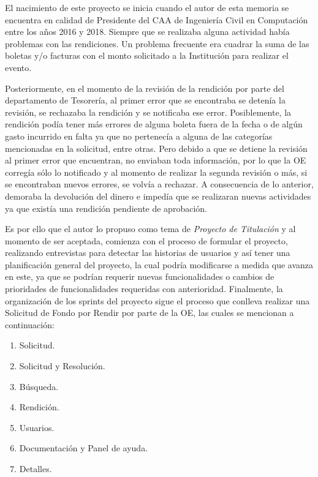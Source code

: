 El nacimiento de este proyecto se inicia cuando el autor de esta memoria se encuentra en calidad de Presidente del CAA de Ingeniería Civil en Computación entre los años 2016 y 2018. Siempre que se realizaba alguna actividad había problemas con las rendiciones. Un problema frecuente era cuadrar la suma de las boletas y/o facturas con el monto solicitado a la Institución para realizar el evento. 

Posteriormente, en el momento de la revisión de la rendición por parte del departamento de Tesorería, al primer error que se encontraba se detenía la revisión, se rechazaba la rendición y se notificaba ese error. Posiblemente, la rendición podía tener más errores de alguna boleta fuera de la fecha o de algún gasto incurrido en falta ya que no pertenecía a alguna de las categorías mencionadas en la solicitud, entre otras. Pero debido a que se detiene la revisión al primer error que encuentran, no enviaban toda información, por lo que la OE corregía sólo lo notificado y al momento de realizar la segunda revisión o más, si se encontraban nuevos errores, se volvía a rechazar. A consecuencia de lo anterior, demoraba la devolución del dinero e impedía que se realizaran nuevas actividades ya que existía una rendición pendiente de aprobación.

Es por ello que el autor lo propuso como tema de \emph{Proyecto de Titulación} y al momento de ser aceptada, comienza con el proceso de formular el proyecto, realizando entrevistas para detectar las historias de usuarios y así tener una planificación general del proyecto, la cual podría modificarse a medida que avanza en este, ya que se podrían requerir nuevas funcionalidades o cambios de prioridades de funcionalidades requeridas con anterioridad. Finalmente, la organización de los sprints del proyecto sigue el proceso que conlleva realizar una Solicitud de Fondo por Rendir por parte de la OE, las cuales se mencionan a continuación:

\begin{enumerate}
    \item Solicitud.
    \item Solicitud y Resolución.
    \item Búsqueda.
    \item Rendición.
    \item Usuarios.
    \item Documentación y Panel de ayuda.
    \item Detalles.
\end{enumerate}

